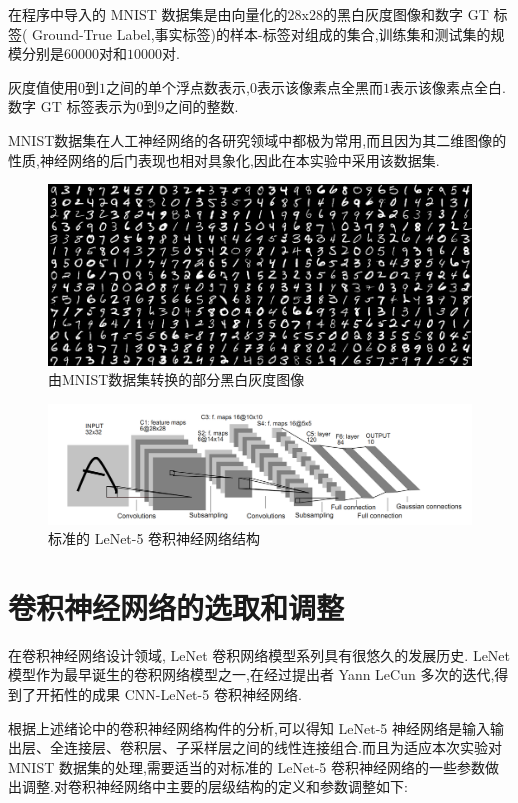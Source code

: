 在程序中导入的 MNIST 数据集是由向量化的$28$x$28$的黑白灰度图像和数字 GT 标签( Ground-True Label,事实标签)的样本-标签对组成的集合,训练集和测试集的规模分别是$60000$对和$10000$对.

灰度值使用$0$到$1$之间的单个浮点数表示,$0$表示该像素点全黑而$1$表示该像素点全白.数字 GT 标签表示为$0$到$9$之间的整数.

MNIST数据集在人工神经网络的各研究领域中都极为常用,而且因为其二维图像的性质,神经网络的后门表现也相对具象化,因此在本实验中采用该数据集.
\begin{figure}
	\centering
	\includegraphics[scale=0.4]{Figures/mnist.png}
	\caption{由MNIST数据集转换的部分黑白灰度图像}
\end{figure}
\begin{figure}
	\centering
	\includegraphics[scale=0.35]{Figures/lenet.png}
	\caption{标准的 LeNet-5 卷积神经网络结构}
\end{figure}

\section{卷积神经网络的选取和调整}

在卷积神经网络设计领域, LeNet 卷积网络模型系列具有很悠久的发展历史. LeNet 模型作为最早诞生的卷积网络模型之一,在经过提出者 Yann LeCun 多次的迭代,得到了开拓性的成果 CNN-LeNet-5 卷积神经网络.

根据上述绪论中的卷积神经网络构件的分析,可以得知 LeNet-5 神经网络是输入输出层、全连接层、卷积层、子采样层之间的线性连接组合.而且为适应本次实验对 MNIST 数据集的处理,需要适当的对标准的 LeNet-5 卷积神经网络的一些参数做出调整.对卷积神经网络中主要的层级结构的定义和参数调整如下:

